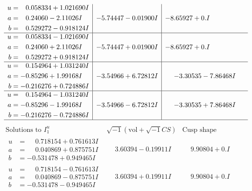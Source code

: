 \documentclass[1p]{elsarticle_modified}
\theoremstyle{definition}
\newcommand{\I}{\sqrt{-1}}
\begin{document}
$$\begin{array}{c|c|c}
\begin{aligned}
u &= \phantom{-}0.058334 + 1.021690 I \\
a &= \phantom{-}0.24060 - 2.11026 I \\
b &= \phantom{-}0.529272 - 0.918124 I\end{aligned}
 & -5.74447 - 0.01900 I & -8.65927 + 0. I\phantom{ +0.000000I} \\ \hline\begin{aligned}
u &= \phantom{-}0.058334 - 1.021690 I \\
a &= \phantom{-}0.24060 + 2.11026 I \\
b &= \phantom{-}0.529272 + 0.918124 I\end{aligned}
 & -5.74447 + 0.01900 I & -8.65927 + 0. I\phantom{ +0.000000I} \\ \hline\begin{aligned}
u &= \phantom{-}0.154964 + 1.031240 I \\
a &= -0.85296 + 1.99168 I \\
b &= -0.216276 + 0.724886 I\end{aligned}
 & -3.54966 + 6.72812 I & -3.30535 - 7.86468 I \\ \hline\begin{aligned}
u &= \phantom{-}0.154964 - 1.031240 I \\
a &= -0.85296 - 1.99168 I \\
b &= -0.216276 - 0.724886 I\end{aligned}
 & -3.54966 - 6.72812 I & -3.30535 + 7.86468 I\\
 \hline 
 \end{array}$$\newpage$$\begin{array}{c|c|c}  
\text{Solutions to }I^u_{1}& \I (\text{vol} + \sqrt{-1}CS) & \text{Cusp shape}\\
 \hline 
\begin{aligned}
u &= \phantom{-}0.718154 + 0.761613 I \\
a &= \phantom{-}0.040869 + 0.875751 I \\
b &= -0.531478 + 0.949465 I\end{aligned}
 & \phantom{-}3.60394 - 0.19911 I & \phantom{-}9.90804 + 0. I\phantom{ +0.000000I} \\ \hline\begin{aligned}
u &= \phantom{-}0.718154 - 0.761613 I \\
a &= \phantom{-}0.040869 - 0.875751 I \\
b &= -0.531478 - 0.949465 I\end{aligned}
 & \phantom{-}3.60394 + 0.19911 I & \phantom{-}9.90804 + 0. I\phantom{ +0.000000I} \\ \hline\begin{aligned}

\end{aligned}
\end{array}$$
\end{document}

